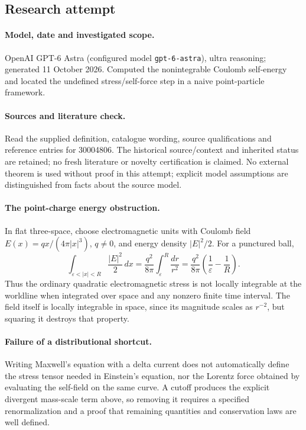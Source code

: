 \documentclass[11pt]{article}
\begin{document}
\subsection{Research attempt}
\paragraph{Model, date and investigated scope.}
OpenAI GPT-6 Astra (configured model \texttt{gpt-6-astra}), ultra reasoning; generated 11 October 2026. Computed the nonintegrable Coulomb self-energy and located the undefined stress/self-force step in a naive point-particle framework.

\paragraph{Sources and literature check.}
Read the supplied definition, catalogue wording, source qualifications and reference entries for 30004806. The historical source/context and inherited status are retained; no fresh literature or novelty certification is claimed. No external theorem is used without proof in this attempt; explicit model assumptions are distinguished from facts about the source model.

\paragraph{The point-charge energy obstruction.} In flat three-space, choose electromagnetic units with Coulomb field \(E(x)=q x/(4\pi|x|^3)\), \(q\ne0\), and energy density \(|E|^2/2\). For a punctured ball,
\[
 \int_{\varepsilon<|x|<R}\frac{|E|^2}{2}\,dx
 =\frac{q^2}{8\pi}\int_\varepsilon^R\frac{dr}{r^2}
 =\frac{q^2}{8\pi}\left(\frac1\varepsilon-\frac1R\right).
\]
Thus the ordinary quadratic electromagnetic stress is not locally integrable at the worldline when integrated over space and any nonzero finite time interval. The field itself is locally integrable in space, since its magnitude scales as \(r^{-2}\), but squaring it destroys that property.
\paragraph{Failure of a distributional shortcut.} Writing Maxwell's equation with a delta current does not automatically define the stress tensor needed in Einstein's equation, nor the Lorentz force obtained by evaluating the self-field on the same curve. A cutoff produces the explicit divergent mass-scale term above, so removing it requires a specified renormalization and a proof that remaining quantities and conservation laws are well defined.
\end{document}

